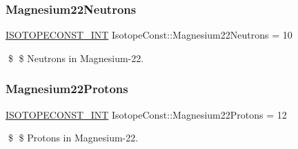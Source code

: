 \subsubsection{\texorpdfstring{Magnesium22\+Neutrons}{Magnesium22Neutrons}}
{\footnotesize\ttfamily \mbox{\hyperlink{group___isotope_const-_macros_ga5f18360b3e99483a35c32d789e62621c}{I\+S\+O\+T\+O\+P\+E\+C\+O\+N\+S\+T\+\_\+\+I\+NT}} Isotope\+Const\+::\+Magnesium22\+Neutrons = 10}

\$ \$ Neutrons in Magnesium-\/22. \mbox{\label{group___isotope_const-_magnesium-_mg22_gab7566ba7a8f3d6feee38af490aebdf6e}} 
\subsubsection{\texorpdfstring{Magnesium22\+Protons}{Magnesium22Protons}}
{\footnotesize\ttfamily \mbox{\hyperlink{group___isotope_const-_macros_ga5f18360b3e99483a35c32d789e62621c}{I\+S\+O\+T\+O\+P\+E\+C\+O\+N\+S\+T\+\_\+\+I\+NT}} Isotope\+Const\+::\+Magnesium22\+Protons = 12}

\$ \$ Protons in Magnesium-\/22. 